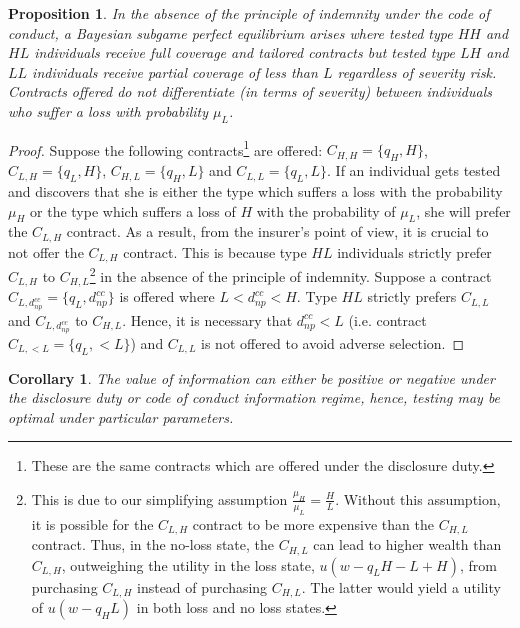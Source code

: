 \documentclass[nonatbib,preprint,12pt]{elsarticle}
\theoremstyle{plain}
\newtheorem{corollary}[theorem]{Corollary}
\newtheorem{prop}[theorem]{Proposition}
\theoremstyle{definition}
\theoremstyle{plain}
\theoremstyle{TheoremNum}
\theoremstyle{CorollaryNum}
\theoremstyle{PropositionNum}
\theoremstyle{TheoremNum}
\begin{document}
\setcounter{theorem}{7}
\renewcommand{\thetheorem}{\arabic{theorem}}
\begin{prop}
In the absence of the principle of indemnity under the code of conduct, a Bayesian subgame perfect equilibrium arises where tested type $HH$ and $HL$ individuals receive full coverage and tailored contracts but tested type $LH$ and $LL$ individuals receive partial coverage of less than $L$ regardless of severity risk. Contracts offered do not differentiate (in terms of severity) between individuals who suffer a loss with probability $\mu_L$.
\end{prop}

\begin{proof}
Suppose the following contracts\footnote{These are the same contracts which are offered under the disclosure duty.} are offered: $C_{H,H}=\{q_H, H\}$, $C_{L,H}=\{q_L, H\}$, $C_{H,L}=\{q_H, L\}$ and $C_{L,L}=\{q_L, L\}$. If an individual gets tested and discovers that she is either the type which suffers a loss with the probability $\mu_H$ or the type which suffers a loss of $H$ with the probability of $\mu_L$, she will prefer the $C_{L,H}$ contract. As a result, from the insurer's point of view, it is crucial to not offer the $C_{L,H}$ contract. This is because type $HL$ individuals strictly prefer $C_{L,H}$ to $C_{H,L}$\footnote{This is due to our simplifying assumption $\frac{\mu_H}{\mu_L} = \frac{H}{L}$. Without this assumption, it is possible for the $C_{L,H}$ contract to be more expensive than the $C_{H,L}$ contract. Thus, in the no-loss state, the $C_{H,L}$ can lead to higher wealth than $C_{L,H}$, outweighing the utility in the loss state, $u(w-q_L H -L + H)$, from purchasing $C_{L,H}$ instead of purchasing $C_{H,L}$. The latter would yield a utility of $u(w-q_H L)$ in both loss and no loss states.} in the absence of the principle of indemnity. Suppose a contract $C_{L,d_{np}^{cc}} = \{q_L, d_{np}^{cc}\}$ is offered where $L<d_{np}^{cc}<H$. Type $HL$ strictly prefers $C_{L,L}$ and $C_{L,d_{np}^{cc}}$ to $C_{H,L}$. Hence, it is necessary that $d_{np}^{cc} < L$ (i.e. contract $C_{L,<L} = \{q_L, <L\}$) and $C_{L,L}$ is not offered to avoid adverse selection.
\end{proof}

\setcounter{theorem}{1}
\renewcommand{\thetheorem}{\arabic{theorem}}
\begin{corollary}
The value of information can either be positive or negative under the disclosure duty or code of conduct information regime, hence, testing may be optimal under particular parameters.  
\end{corollary}
\end{document}

